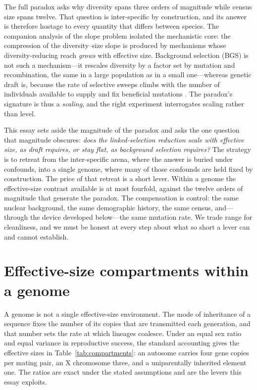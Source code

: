 \documentclass[11pt,a4paper]{article}
\begin{document}
The full paradox asks why diversity spans three orders of magnitude while census size spans twelve. That question is inter-specific by construction, and its answer is therefore hostage to every quantity that differs between species. The companion analysis of the slope problem isolated the mechanistic core: the compression of the diversity--size slope is produced by mechanisms whose diversity-reducing reach \emph{grows} with effective size. Background selection (BGS) is not such a mechanism---it rescales diversity by a factor set by mutation and recombination, the same in a large population as in a small one---whereas genetic draft is, because the rate of selective sweeps climbs with the number of individuals available to supply and fix beneficial mutations \citep{ccc1993,msh1974,gillespie2000}. The paradox's signature is thus a \emph{scaling}, and the right experiment interrogates scaling rather than level.

This essay sets aside the magnitude of the paradox and asks the one question that magnitude obscures: \emph{does the linked-selection reduction scale with effective size, as draft requires, or stay flat, as background selection requires?} The strategy is to retreat from the inter-specific arena, where the answer is buried under confounds, into a single genome, where many of those confounds are held fixed by construction. The price of that retreat is a short lever. Within a genome the effective-size contrast available is at most fourfold, against the twelve orders of magnitude that generate the paradox. The compensation is control: the same nuclear background, the same demographic history, the same census, and---through the device developed below---the same mutation rate. We trade range for cleanliness, and we must be honest at every step about what so short a lever can and cannot establish.

\section{Effective-size compartments within a genome}

A genome is not a single effective-size environment. The mode of inheritance of a sequence fixes the number of its copies that are transmitted each generation, and that number sets the rate at which lineages coalesce. Under an equal sex ratio and equal variance in reproductive success, the standard accounting gives the effective sizes in Table~\ref{tab:compartments}: an autosome carries four gene copies per mating pair, an X chromosome three, and a uniparentally inherited element one. The ratios are exact under the stated assumptions and are the levers this essay exploits.
\end{document}
